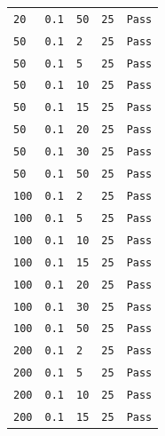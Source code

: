 \documentclass[11pt]{article}
\begin{document}
\begin{appendices}
{\begin{center}
\begin{tabular}{|l|l|l|l|l|}
\texttt{20} & \texttt{0.1} & \texttt{50} & \texttt{25} & {\color{forestgreen!70}\texttt{Pass}}\\
\texttt{50} & \texttt{0.1} & \texttt{2} & \texttt{25} & {\color{forestgreen!70}\texttt{Pass}}\\
\texttt{50} & \texttt{0.1} & \texttt{5} & \texttt{25} & {\color{forestgreen!70}\texttt{Pass}}\\
\texttt{50} & \texttt{0.1} & \texttt{10} & \texttt{25} & {\color{forestgreen!70}\texttt{Pass}}\\
\texttt{50} & \texttt{0.1} & \texttt{15} & \texttt{25} & {\color{forestgreen!70}\texttt{Pass}}\\
\texttt{50} & \texttt{0.1} & \texttt{20} & \texttt{25} & {\color{forestgreen!70}\texttt{Pass}}\\
\texttt{50} & \texttt{0.1} & \texttt{30} & \texttt{25} & {\color{forestgreen!70}\texttt{Pass}}\\
\texttt{50} & \texttt{0.1} & \texttt{50} & \texttt{25} & {\color{forestgreen!70}\texttt{Pass}}\\
\texttt{100} & \texttt{0.1} & \texttt{2} & \texttt{25} & {\color{forestgreen!70}\texttt{Pass}}\\
\texttt{100} & \texttt{0.1} & \texttt{5} & \texttt{25} & {\color{forestgreen!70}\texttt{Pass}}\\
\texttt{100} & \texttt{0.1} & \texttt{10} & \texttt{25} & {\color{forestgreen!70}\texttt{Pass}}\\
\texttt{100} & \texttt{0.1} & \texttt{15} & \texttt{25} & {\color{forestgreen!70}\texttt{Pass}}\\
\texttt{100} & \texttt{0.1} & \texttt{20} & \texttt{25} & {\color{forestgreen!70}\texttt{Pass}}\\
\texttt{100} & \texttt{0.1} & \texttt{30} & \texttt{25} & {\color{forestgreen!70}\texttt{Pass}}\\
\texttt{100} & \texttt{0.1} & \texttt{50} & \texttt{25} & {\color{forestgreen!70}\texttt{Pass}}\\
\texttt{200} & \texttt{0.1} & \texttt{2} & \texttt{25} & {\color{forestgreen!70}\texttt{Pass}}\\
\texttt{200} & \texttt{0.1} & \texttt{5} & \texttt{25} & {\color{forestgreen!70}\texttt{Pass}}\\
\texttt{200} & \texttt{0.1} & \texttt{10} & \texttt{25} & {\color{forestgreen!70}\texttt{Pass}}\\
\texttt{200} & \texttt{0.1} & \texttt{15} & \texttt{25} & {\color{forestgreen!70}\texttt{Pass}}\\

\end{tabular}
\end{center}}
\end{appendices}
\end{document}
